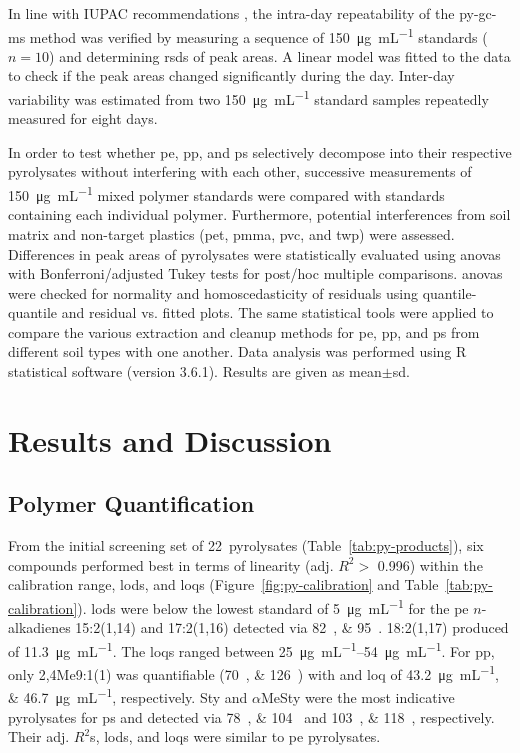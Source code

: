 In line with IUPAC recommendations \citep{CurrieNomenclature1995}, the intra-day repeatability of the \ac{py-gc-ms} method was verified by measuring a sequence of \SI{150}{\micro\gram\per\milli\liter} standards ($n = 10$) and determining \acp{rsd} of peak areas. A linear model was fitted to the data to check if the peak areas changed significantly during the day. Inter-day variability was estimated from two \SI{150}{\micro\gram\per\milli\liter} standard samples repeatedly measured for eight days.

In order to test whether \ac{pe}, \ac{pp}, and \ac{ps} selectively decompose into their respective pyrolysates without interfering with each other, successive measurements of \SI{150}{\micro\gram\per\milli\liter} mixed polymer standards were compared with standards containing each individual polymer. Furthermore, potential interferences from soil matrix and non-target plastics (\ac{pet}, \ac{pmma}, \ac{pvc}, and \ac{twp}) were assessed. Differences in peak areas of pyrolysates were statistically evaluated using \acp{anova} with Bonferroni\-/adjusted Tukey tests for post\-/hoc multiple comparisons. \Acp{anova} were checked for normality and homoscedasticity of residuals using quantile\--quantile and residual vs. fitted plots.
The same statistical tools were applied to compare the various extraction and cleanup methods for \ac{pe}, \ac{pp}, and \ac{ps} from different soil types with one another.
Data analysis was performed using R statistical software (version 3.6.1).
Results are given as mean$\pm$\ac{sd}.

\section{Results and Discussion}

\subsection{Polymer Quantification}

From the initial screening set of 22~pyrolysates (Table~\ref{tab:py-products}), six compounds performed best in terms of linearity (adj. $R^2 >$ \num{0.996}) within the calibration range, \acp{lod}, and \acp{loq} (Figure~\ref{fig:py-calibration} and Table~\ref{tab:py-calibration}). \Acp{lod} were below the lowest standard of \SI{5}{\micro\gram\per\milli\liter} for the \ac{pe} $n$-alkadienes 15:2(1,14) and 17:2(1,16) detected via \SIlist{82;95}{\mz}. 18:2(1,17) produced  of \SI{11.3}{\micro\gram\per\milli\liter}. The \acp{loq} ranged between \SIrange[range-phrase = { and }]{25}{54}{\micro\gram\per\milli\liter}.
For \ac{pp}, only 2,4Me9:1(1) was quantifiable (\SIlist{70;126}{\mz}) with  and \ac{loq} of \SIlist{43.2;46.7}{\micro\gram\per\milli\liter}, respectively.
Sty and $\alpha$MeSty were the most indicative pyrolysates for \ac{ps} and detected via \SIlist{78;104}{\mz} and \SIlist{103;118}{\mz}, respectively. Their adj. $R^2$s, \acp{lod}, and \acp{loq} were similar to \ac{pe} pyrolysates.

